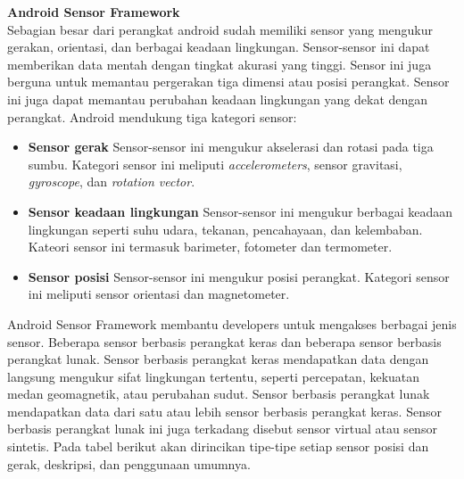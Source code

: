 \documentclass[a4paper,twoside]{article}
\begin{document}
\begin{enumerate}
\textbf{Android Sensor Framework}\\

\label{sec:android_sensor_framework}
\cite{android_developers}Sebagian besar dari perangkat android sudah memiliki sensor yang mengukur gerakan, orientasi, dan berbagai keadaan lingkungan. Sensor-sensor ini dapat memberikan data mentah dengan tingkat akurasi yang tinggi. Sensor ini juga berguna untuk memantau pergerakan tiga dimensi atau posisi perangkat. Sensor ini juga dapat memantau perubahan keadaan lingkungan yang dekat dengan perangkat. 
Android mendukung tiga kategori sensor:
\begin{itemize}
	\item \textbf{Sensor gerak}
	Sensor-sensor ini mengukur akselerasi dan rotasi pada tiga sumbu. Kategori sensor ini meliputi \textit{accelerometers}, sensor gravitasi, \textit{gyroscope}, dan \textit{rotation vector}. 
	\item \textbf{Sensor keadaan lingkungan}
	Sensor-sensor ini mengukur berbagai keadaan lingkungan seperti suhu udara, tekanan, pencahayaan, dan kelembaban. Kateori sensor ini termasuk barimeter, fotometer dan termometer.
	\item \textbf{Sensor posisi}
	Sensor-sensor ini mengukur posisi perangkat. Kategori sensor ini meliputi sensor orientasi dan magnetometer.
\end{itemize}
Android Sensor Framework membantu developers untuk mengakses berbagai jenis sensor. Beberapa sensor berbasis perangkat keras dan beberapa sensor berbasis perangkat lunak. Sensor berbasis perangkat keras mendapatkan data dengan langsung mengukur sifat lingkungan tertentu, seperti percepatan, kekuatan medan geomagnetik, atau perubahan sudut. Sensor berbasis perangkat lunak mendapatkan data dari satu atau lebih sensor berbasis perangkat keras. Sensor berbasis perangkat lunak ini juga terkadang disebut sensor virtual atau sensor sintetis. Pada tabel berikut akan dirincikan tipe-tipe setiap sensor posisi dan gerak, deskripsi, dan penggunaan umumnya.


\end{enumerate}
\end{document}

